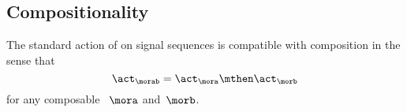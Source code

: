 
\subsection{Compositionality}

\begin{proposition}
    \label{prop:moore-action-is-a-morphism}
    The standard action of  on signal sequences is compatible with  composition in the sense that
    \begin{equation}
        \label{eq:moore-action-compositional}
        \act_{\morab} = \act_\mora \mthen \act_\morb
    \end{equation}
    for any composable ~$\mora$ and~$\morb$.
\end{proposition}

